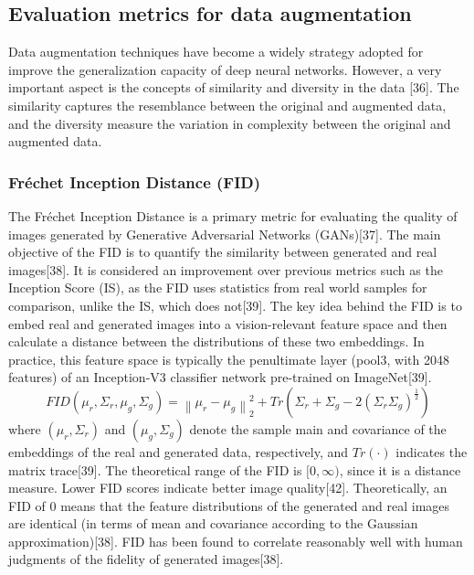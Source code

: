 \documentclass[journal]{IEEEtran}
\begin{document}
\subsection{Evaluation metrics for data augmentation}
Data augmentation techniques have become a widely strategy adopted for improve the generalization capacity of deep neural networks. However, a very important aspect is the concepts of similarity and diversity in the data [36]. The similarity captures the resemblance between the original and augmented data, and the diversity measure the variation in complexity between the original and augmented data.


\subsubsection{Fréchet Inception Distance (FID)}
The Fréchet Inception Distance is a primary metric for evaluating the quality of images generated by Generative Adversarial Networks (GANs)[37]. The main objective of the FID is to quantify the similarity between generated and real images[38]. It is considered an improvement over previous metrics such as the Inception Score (IS), as the FID uses statistics from real world samples for comparison, unlike the IS, which does not[39].
The key idea behind the FID is to embed real and generated images into a vision-relevant feature space and then calculate a distance between the distributions of these two embeddings. In practice, this feature space is typically the penultimate layer (pool3, with 2048 features) of an Inception-V3 classifier network pre-trained on ImageNet[39].
$$FID(\mu_r,\Sigma_r,\mu_g,\Sigma_g )=\left\|\mu_r-\mu_g \right\|_2^2+Tr(\Sigma_r+\Sigma_g-2(\Sigma_r \Sigma_g)^{\frac{1}{2}})$$
where $(\mu_r,\Sigma_r)$ and $(\mu_g,\Sigma_g)$ denote the sample main and covariance of the embeddings of the real and generated data, respectively, and $Tr(\cdot)$ indicates the matrix trace[39].
The theoretical range of the FID is $[0, \infty)$, since it is a distance measure. Lower FID scores indicate better image quality[42]. Theoretically, an FID of 0 means that the feature distributions of the generated and real images are identical (in terms of mean and covariance according to the Gaussian approximation)[38].
FID has been found to correlate reasonably well with human judgments of the fidelity of generated images[38].
\end{document}
